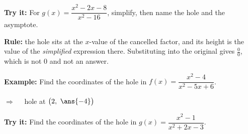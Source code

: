 \documentclass[12pt]{article}
\begin{document}
\begin{tryitbox}
\textbf{Try it:} \quad For $g(x) = \dfrac{x^2-2x-8}{x^2-16}$, simplify, then name
the hole and the asymptote.\\[2pt]
\end{tryitbox}


\begin{formulabox}
\textbf{Rule:} the hole sits at the $x$-value of the cancelled factor, and its
height is the value of the \emph{simplified} expression there. Substituting into
the original gives $\frac{0}{0}$, which is not $0$ and not an answer.
\end{formulabox}

\begin{examplebox}
\textbf{Example:} \quad Find the coordinates of the hole in
$f(x) = \dfrac{x^2-4}{x^2-5x+6}$.

$\Rightarrow\quad$ hole at $\bigl(2,\ \ans{-4}\bigr)$
\end{examplebox}

\begin{tryitbox}
\textbf{Try it:} \quad Find the coordinates of the hole in
$g(x) = \dfrac{x^2-1}{x^2+2x-3}$.\\[2pt]
\end{tryitbox}
\end{document}
